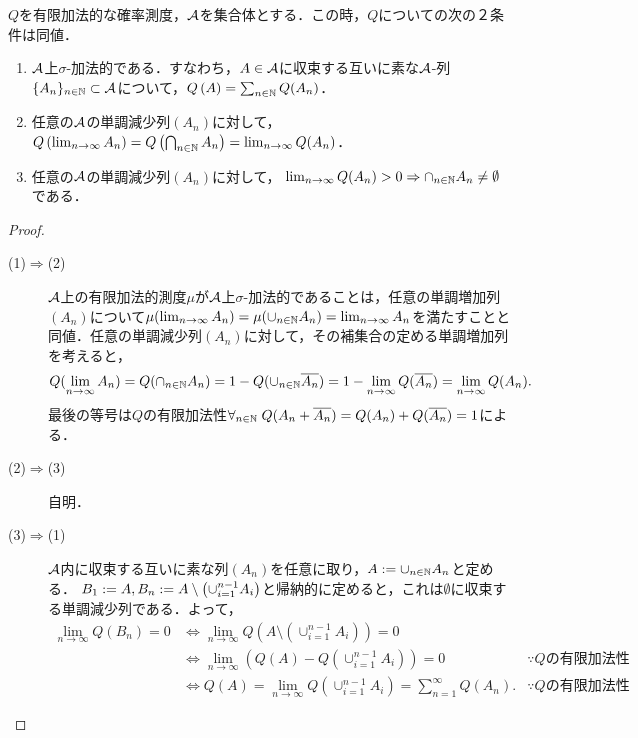\documentclass[uplatex,dvipdfmx]{jsreport}
\begin{document}
\begin{lemma}[有限加法的確率空間の完全加法性の単調族による特徴付け]
    $Q$を有限加法的な確率測度，$\mathcal{A}$を集合体とする．この時，$Q$についての次の２条件は同値．
    \begin{enumerate}
        \item $\mathcal{A}$上$\sigma$-加法的である．すなわち，$A\in\mathcal{A}$に収束する互いに素な$\mathcal{A}$-列$\{A_n\}_{n\in\mathbb{N}}\subset\mathcal{A}$について，$Q\left(A\right)=\sum_{n\in\mathbb{N}}Q(A_n)$．
        \item 任意の$\mathcal{A}$の単調減少列$(A_n)$に対して，$Q\left(\lim_{n\to\infty}A_n\right)=Q\left(\bigcap_{n\in\mathbb{N}}A_n\right)=\lim_{n\to\infty}Q(A_n)$．
        \item 任意の$\mathcal{A}$の単調減少列$(A_n)$に対して，
        $\lim_{n\to\infty}Q(A_n)>0\Rightarrow\cap_{n\in\mathbb{N}}A_n\ne\emptyset$である．
    \end{enumerate}
\end{lemma}
\begin{proof}\mbox{}
    \begin{description}
        \item[(1)$\Rightarrow$(2)] $\mathcal{A}$上の有限加法的測度$\mu$が$\mathcal{A}$上$\sigma$-加法的であることは，任意の単調増加列$(A_n)$について$\mu(\lim_{n\to\infty}A_n)=\mu(\cup_{n\in\mathbb{N}}A_n)=\lim_{n\to\infty}A_n$を満たすことと同値．任意の単調減少列$(A_n)$に対して，その補集合の定める単調増加列を考えると，\[Q(\lim_{n\to\infty}A_n)=Q(\cap_{n\in\mathbb{N}}A_n)=1-Q(\cup_{n\in\mathbb{N}}\overline{A_n})=1-\lim_{n\to\infty}Q(\overline{A_n})=\lim_{n\to\infty}Q(A_n).\]最後の等号は$Q$の有限加法性$\forall_{n\in\mathbb{N}}\;Q(A_n+\overline{A_n})=Q(A_n)+Q(\overline{A_n})=1$による．
        \item[(2)$\Rightarrow$(3)] 自明．
        \item[(3)$\Rightarrow$(1)] $\mathcal{A}$内に収束する互いに素な列$(A_n)$を任意に取り，$A:=\cup_{n\in\mathbb{N}}A_n$と定める．
        $B_1:=A,B_n:=A\setminus\left(\cup_{i=1}^{n-1}A_{i}\right)$と帰納的に定めると，これは$\emptyset$に収束する単調減少列である．よって，
        \begin{align*}
            \lim_{n\to\infty}Q(B_n)=0&\Leftrightarrow \lim_{n\to\infty}Q(A\setminus(\cup_{i=1}^{n-1}A_i))=0\\
            &\Leftrightarrow \lim_{n\to\infty}(Q(A)-Q(\cup_{i=1}^{n-1}A_i))=0&\because Qの有限加法性\\
            &\Leftrightarrow Q(A)=\lim_{n\to\infty}Q(\cup_{i=1}^{n-1}A_i)=\sum_{n=1}^\infty Q(A_n).&\because Qの有限加法性
        \end{align*}
    \end{description}
\end{proof}
\end{document}
